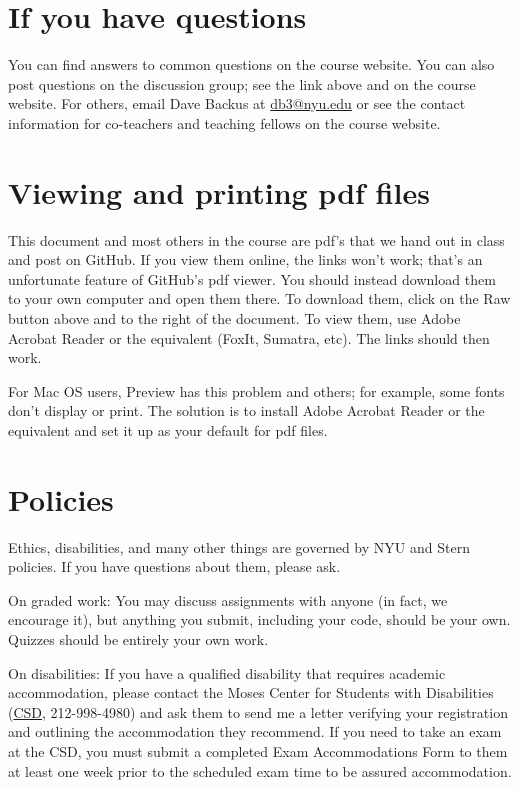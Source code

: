 \documentclass[11pt]{article}
\begin{document}
\section*{If you have questions}

You can find answers to common questions on the course website.
You can also post questions on the discussion group;
see the link above and on the course website.   
%
%
For others, email Dave Backus at \href{mailto:db3@nyu.edu}{db3@nyu.edu}
or see the contact information for co-teachers and teaching fellows on the course website. 


\section*{Viewing and printing pdf files}

This document and most others in the course are pdf's that we hand out in class and post on GitHub.
If you view them online, the links won't work; that's an unfortunate feature of GitHub's pdf viewer.  
You should instead download them to your own computer and open them there.  
To download them, 
click on the Raw button above and to the right of the document.  
To view them, use Adobe Acrobat Reader or the equivalent (FoxIt, Sumatra, etc).
The links should then work.  

For Mac OS users, Preview has this problem and others; for example, 
some fonts don't display or print.
The solution is to install Adobe Acrobat Reader or the equivalent 
and set it up as your default for pdf files.  


\section*{Policies}

Ethics, disabilities, and many other things are governed by NYU
and Stern policies.
If you have questions about them, please ask.

On graded work:
You may discuss assignments with anyone (in fact, we encourage it),
but anything you submit, including your code, should be your own.
Quizzes should be entirely your own work.

On disabilities:
If you have a qualified disability that requires academic accommodation,
please contact the Moses Center for Students with Disabilities
(\href{http://www.nyu.edu/life/safety-health-wellness/students-with-disabilities.html}{CSD},
212-998-4980) and ask them to
send me a letter verifying your registration and outlining the accommodation they recommend.
If you need to take an exam at the CSD,
you must submit a completed Exam Accommodations Form to them
at least one week prior to the scheduled exam time to be assured accommodation.



\end{document}
